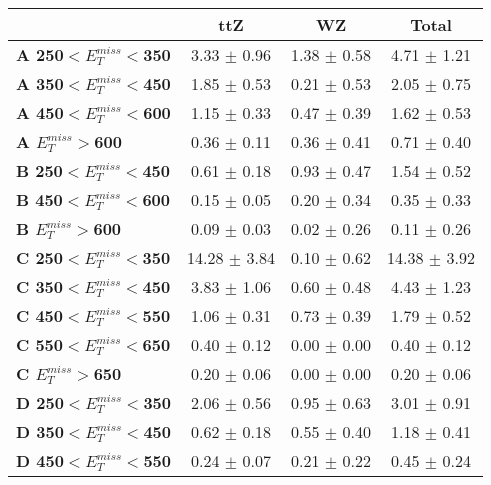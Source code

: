 \begin{table}[h]
\begin{center}
\begin{tabular}{|l|ccc|}
\hline
&
\textbf{ttZ}    &
\textbf{WZ}     &
\textbf{Total}  \\
\hline
\textbf{ A 250$<E_T^{miss}<$350}         & 3.33 $\pm$ 0.96       & 1.38 $\pm$ 0.58       & 4.71 $\pm$ 1.21       \\
\textbf{ A 350$<E_T^{miss}<$450}         & 1.85 $\pm$ 0.53       & 0.21 $\pm$ 0.53       & 2.05 $\pm$ 0.75       \\
\textbf{ A 450$<E_T^{miss}<$600}         & 1.15 $\pm$ 0.33       & 0.47 $\pm$ 0.39       & 1.62 $\pm$ 0.53       \\
\textbf{ A $E_T^{miss}>$600}     & 0.36 $\pm$ 0.11       & 0.36 $\pm$ 0.41       & 0.71 $\pm$ 0.40       \\
\textbf{ B 250$<E_T^{miss}<$450}         & 0.61 $\pm$ 0.18       & 0.93 $\pm$ 0.47       & 1.54 $\pm$ 0.52       \\
\textbf{ B 450$<E_T^{miss}<$600}         & 0.15 $\pm$ 0.05       & 0.20 $\pm$ 0.34       & 0.35 $\pm$ 0.33       \\
\textbf{ B $E_T^{miss}>$600}     & 0.09 $\pm$ 0.03       & 0.02 $\pm$ 0.26       & 0.11 $\pm$ 0.26       \\
\textbf{ C 250$<E_T^{miss}<$350}         & 14.28 $\pm$ 3.84      & 0.10 $\pm$ 0.62       & 14.38 $\pm$ 3.92      \\
\textbf{ C 350$<E_T^{miss}<$450}         & 3.83 $\pm$ 1.06       & 0.60 $\pm$ 0.48       & 4.43 $\pm$ 1.23       \\
\textbf{ C 450$<E_T^{miss}<$550}         & 1.06 $\pm$ 0.31       & 0.73 $\pm$ 0.39       & 1.79 $\pm$ 0.52       \\
\textbf{ C 550$<E_T^{miss}<$650}         & 0.40 $\pm$ 0.12       & 0.00 $\pm$ 0.00       & 0.40 $\pm$ 0.12       \\
\textbf{ C $E_T^{miss}>$650}     & 0.20 $\pm$ 0.06       & 0.00 $\pm$ 0.00       & 0.20 $\pm$ 0.06       \\
\textbf{ D 250$<E_T^{miss}<$350}         & 2.06 $\pm$ 0.56       & 0.95 $\pm$ 0.63       & 3.01 $\pm$ 0.91       \\
\textbf{ D 350$<E_T^{miss}<$450}         & 0.62 $\pm$ 0.18       & 0.55 $\pm$ 0.40       & 1.18 $\pm$ 0.41       \\
\textbf{ D 450$<E_T^{miss}<$550}         & 0.24 $\pm$ 0.07       & 0.21 $\pm$ 0.22       & 0.45 $\pm$ 0.24       \\

\end{tabular}
\end{center}
\end{table}
